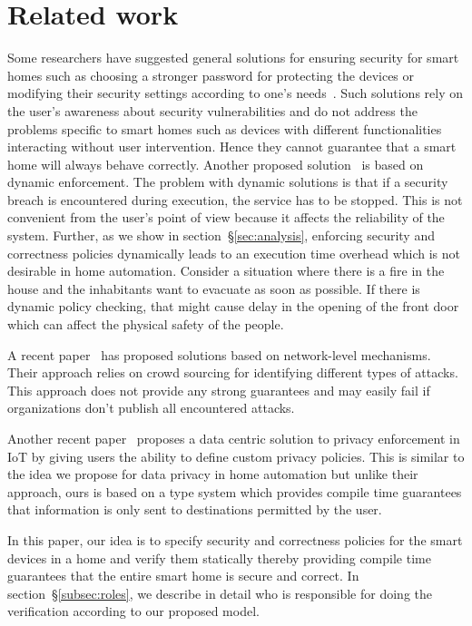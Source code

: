 \documentclass{article}
\begin{document}
\section{Related work}
Some researchers have suggested general solutions for ensuring security for smart homes such as choosing a stronger password for protecting the devices or modifying their security settings according to one's needs~\cite{semantec}. Such solutions rely on the user's awareness about security vulnerabilities and do not address the problems specific to smart homes such as devices with different functionalities interacting without user intervention. Hence they cannot guarantee that a smart home will always behave correctly. Another proposed solution~\cite{al2000secure} is based on dynamic enforcement. The problem with dynamic solutions is that if a security breach is encountered during execution, the service has to be stopped. This is not convenient from the user's point of view because it affects the reliability of the system. Further, as we show in section~\S\ref{sec:analysis}, enforcing security and correctness policies dynamically leads to an execution time overhead which is not desirable in home automation. Consider a situation where there is a fire in the house and the inhabitants want to evacuate as soon as possible. If there is dynamic policy checking, that might cause delay in the opening of the front door which can affect the physical safety of the people. 

A recent paper~\cite{trillions} has proposed solutions based on network-level mechanisms. Their approach relies on crowd sourcing for identifying different types of attacks. This approach does not provide any strong guarantees and may easily fail if organizations don't publish all encountered attacks. 

Another recent paper~\cite{googleIoT} proposes a data centric solution to privacy enforcement in IoT by giving users the ability to define custom privacy policies. This is similar to the idea we propose for data privacy in home automation but unlike their approach, ours is based on a type system which provides compile time guarantees that information is only sent to destinations permitted by the user. 


In this paper, our idea is to specify security and correctness policies for the smart devices in a home and verify them statically thereby providing compile time guarantees that the entire smart home is secure and correct. In section~\S\ref{subsec:roles}, we describe in detail who is responsible for doing the verification according to our proposed model.
\end{document}
